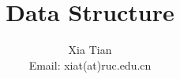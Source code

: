 \documentclass[table, 13pt, slidestop,compress,mathserif]{beamer}
\begin{document}
\title{Data Structure}
\author{Xia Tian \\ Email: xiat(at)ruc.edu.cn }
\date{
}
\frame{\titlepage}

% 

\end{document}
